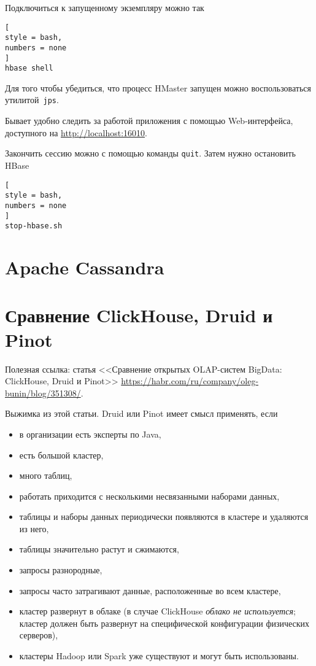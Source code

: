 \documentclass[%
	11pt,
	a4paper,
	utf8,
		]{article}
\begin{document}
Подключиться к запущенному экземпляру можно так
\begin{lstlisting}[
style = bash,
numbers = none	
]
hbase shell
\end{lstlisting}

Для того чтобы убедиться, что процесс HMaster запущен можно воспользоваться утилитой~\texttt{jps}.

Бывает удобно следить за работой приложения с помощью Web-интерфейса, доступного на \url{http://localhost:16010}.

Закончить сессию можно с помощью команды \texttt{quit}. Затем нужно остановить HBase
\begin{lstlisting}[
style = bash,
numbers = none
]
stop-hbase.sh
\end{lstlisting}


\section{Apache Cassandra}

\section{Сравнение ClickHouse, Druid и Pinot}

Полезная ссылка: статья <<Сравнение открытых OLAP-систем BigData: ClickHouse, Druid и Pinot>> \url{https://habr.com/ru/company/oleg-bunin/blog/351308/}.

Выжимка из этой статьи. Druid или Pinot имеет смысл применять, если
\begin{itemize}
	\item в организации есть эксперты по Java,
	
	\item есть большой кластер,
	
	\item много таблиц,
	
	\item работать приходится с несколькими несвязанными наборами данных,
	
	\item таблицы и наборы данных периодически появляются в кластере и удаляются из него,
	
	\item таблицы значительно растут и сжимаются,
	
	\item запросы разнородные,
	
	\item запросы часто затрагивают данные, расположенные во всем кластере,
	
	\item кластер развернут в облаке (в случае ClickHouse \emph{облако не используется}; кластер должен быть развернут на специфической конфигурации физических серверов),
	
	\item кластеры Hadoop или Spark уже существуют и могут быть использованы.
\end{itemize}
\end{document}
